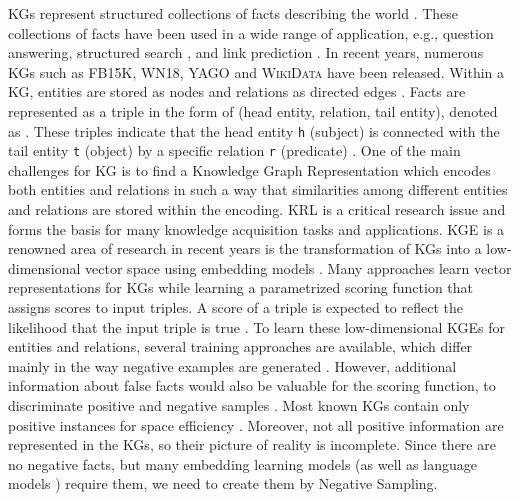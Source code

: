 

\acp{KG} represent structured collections of facts describing the world   \cite{hogan2020knowledge}.
These collections of facts have been used in a wide range of application, e.g., question answering, structured search \cite{zhang2019nscaching}, and link prediction \cite{cai2017kbgan, Alam2020AffinityDN}.
In recent years, numerous \acp{KG} such as \textsc{FB15K}, \textsc{WN18}, \textsc{YAGO} \cite{ConEx} and \textsc{WikiData} \cite{arnaoutwikinegata} have been released.
Within a \ac{KG}, entities are stored as nodes and relations as directed edges \cite{zhang2019nscaching}.
Facts are represented as a triple in the form of (head entity, relation, tail entity), denoted as .
These triples indicate that the head entity \texttt{h} (subject) is connected with the tail entity \texttt{t} (object) by a specific relation \texttt{r} (predicate) \cite{zhang2019nscaching, Alam2020AffinityDN}.
One of the main challenges for \ac{KG} is to find a Knowledge Graph Representation which encodes both entities and relations in such a way that similarities among different entities and relations are stored within the encoding. 
\ac{KRL} is a critical research issue and forms the basis for many knowledge acquisition tasks and applications.
\ac{KGE} is a renowned area of research in recent years is the transformation of \acp{KG} into a low-dimensional vector space using embedding models \cite{Alam2020AffinityDN}.
Many approaches learn vector representations for \acp{KG} while learning a parametrized scoring function that assigns scores to input triples.
A score of a triple is expected to reflect the likelihood that the input triple is true \cite{ConvE, qiannegative}.
To learn these low-dimensional \acp{KGE} for entities and relations, several training approaches are available, which differ mainly in the way negative examples are generated \cite{Ruffinelli2020You}. 
However, additional information about false facts would also be valuable for the scoring function, to discriminate positive and negative samples \cite{qiannegative}.
Most known \acp{KG} contain only positive instances for space efficiency \cite{qiannegative}.
Moreover, not all positive information are represented in the \acp{KG}, so their picture of reality is incomplete.
Since there are no negative facts, but many embedding learning models (as well as language models \cite{MikolovSCCD13}) require them, we need to create them by Negative Sampling.